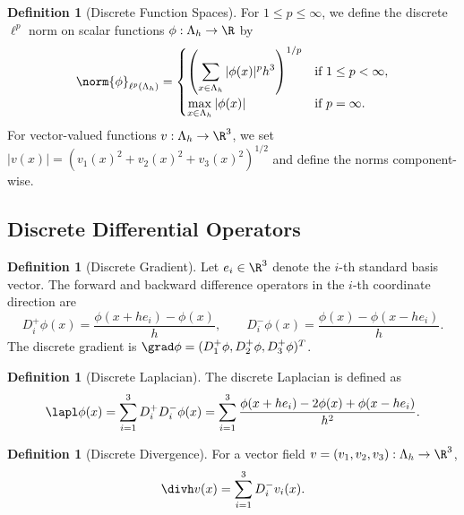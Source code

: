 \documentclass[12pt, a4paper]{article}
\theoremstyle{plain}
\theoremstyle{definition}
\newtheorem{definition}[theorem]{Definition}
\begin{document}
\begin{definition}[Discrete Function Spaces]\label{def:spaces}
  For $1 \leq p \leq \infty$, we define the discrete $\ell^p$ norm on
  scalar functions $\phi: \Lambda_h \to \R$ by
  \begin{equation}
    \norm{\phi}_{\ell^p(\Lambda_h)} =
    \begin{cases}
      \displaystyle\left( \sum_{x \in \Lambda_h} |\phi(x)|^p h^3 \right)^{1/p} & \text{if } 1 \leq p < \infty, \\[10pt]
      \displaystyle\max_{x \in \Lambda_h} |\phi(x)| & \text{if } p = \infty.
    \end{cases}
  \end{equation}
  For vector-valued functions $v: \Lambda_h \to \R^3$, we set
  $|v(x)| = (v_1(x)^2 + v_2(x)^2 + v_3(x)^2)^{1/2}$ and define the norms
  component-wise.
\end{definition}

\subsection{Discrete Differential Operators}

\begin{definition}[Discrete Gradient]\label{def:grad}
  Let $e_i \in \R^3$ denote the $i$-th standard basis vector. The forward and
  backward difference operators in the $i$-th coordinate direction are
  \begin{equation}
    D_i^+ \phi(x) = \frac{\phi(x + he_i) - \phi(x)}{h}, \qquad
    D_i^- \phi(x) = \frac{\phi(x) - \phi(x - he_i)}{h}.
  \end{equation}
  The discrete gradient is $\grad \phi = (D_1^+ \phi, D_2^+ \phi, D_3^+ \phi)^T$.
\end{definition}

\begin{definition}[Discrete Laplacian]\label{def:lapl}
  The discrete Laplacian is defined as
  \begin{equation}
    \lapl \phi(x) = \sum_{i=1}^{3} D_i^+ D_i^- \phi(x)
    = \sum_{i=1}^{3} \frac{\phi(x+he_i) - 2\phi(x) + \phi(x-he_i)}{h^2}.
  \end{equation}
\end{definition}

\begin{definition}[Discrete Divergence]\label{def:div}
  For a vector field $v = (v_1, v_2, v_3): \Lambda_h \to \R^3$,
  \begin{equation}
    \divh v(x) = \sum_{i=1}^{3} D_i^- v_i(x).
  \end{equation}
\end{definition}
\end{document}
